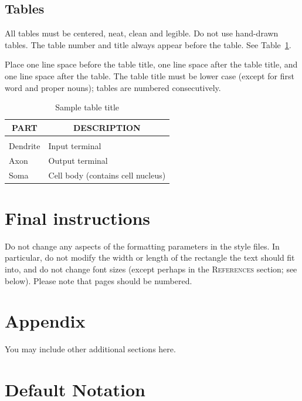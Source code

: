 \documentclass{article} %
\begin{document}
\subsection{Tables}

All tables must be centered, neat, clean and legible. Do not use hand-drawn
tables. The table number and title always appear before the table. See
Table~\ref{sample-table}.

Place one line space before the table title, one line space after the table
title, and one line space after the table. The table title must be lower case
(except for first word and proper nouns); tables are numbered consecutively.

\begin{table}[t]
\caption{Sample table title}
\label{sample-table}
\begin{center}
\begin{tabular}{ll}
\multicolumn{1}{c}{\bf PART}  &\multicolumn{1}{c}{\bf DESCRIPTION}
\\ \hline \\
Dendrite         &Input terminal \\
Axon             &Output terminal \\
Soma             &Cell body (contains cell nucleus) \\
\end{tabular}
\end{center}
\end{table}


\section{Final instructions}
Do not change any aspects of the formatting parameters in the style files.
In particular, do not modify the width or length of the rectangle the text
should fit into, and do not change font sizes (except perhaps in the
\textsc{References} section; see below). Please note that pages should be
numbered.




\appendix
\section{Appendix}
You may include other additional sections here.


\section{Default Notation}
\end{document}
